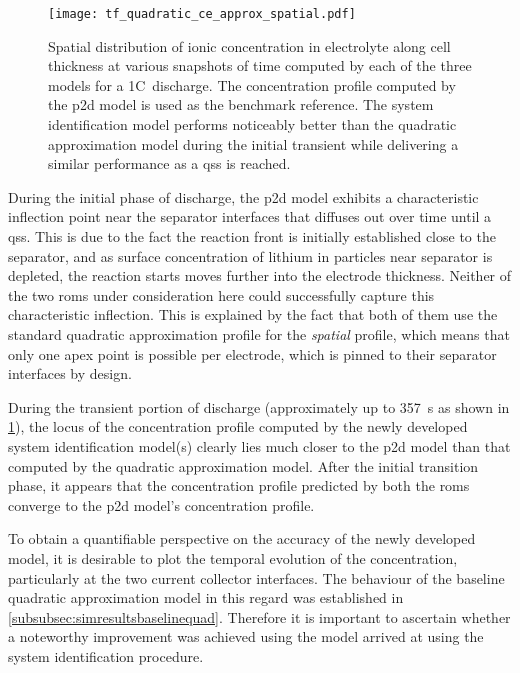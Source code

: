 \begin{figure}[!htbp]
    \centering
    \texttt{[image: tf\_quadratic\_ce\_approx\_spatial.pdf]}
    \caption[Spatial distribution of ionic concentration in
    electrolyte for a 1C~discharge computed by the , quadratic
    approximation \& system identification models]{%
        Spatial distribution of ionic concentration  in electrolyte along cell
        thickness at various  snapshots of  time computed  by each of  the three
        models for  a 1C~discharge.  The concentration  profile  computed by
        the  \gls{p2d} model is used as the benchmark reference. The  system
        identification model performs noticeably better than the quadratic
        approximation model during  the initial  transient  while delivering a
        similar performance as a \gls{qss} is reached.
}%
\label{fig:tfquadp2dspatialionicconc1C}
\end{figure}

During  the  initial  phase  of   discharge,  the  \gls{p2d}  model  exhibits  a
characteristic inflection point near the  separator interfaces that diffuses out
over time  until a  \gls{qss}. This  is due to  the fact  the reaction  front is
initially established  close to the  separator, and as surface  concentration of
lithium  in particles  near separator  is  depleted, the  reaction starts  moves
further  into the  electrode thickness.  Neither  of the  two \glspl{rom}  under
consideration here  could successfully  capture this  characteristic inflection.
This is  explained by  the fact  that both  of them  use the  standard quadratic
approximation profile for the \emph{spatial}  profile, which means that only one
apex  point is  possible  per  electrode, which  is  pinned  to their  separator
interfaces by design.

During the transient portion of discharge (approximately up to \SI{357}{\second}
as   shown   in \cref{fig:tfquadp2dspatialionicconc1C}),   the  locus   of   the
concentration  profile computed  by  the newly  developed system  identification
model(s) clearly lies  much closer to the \gls{p2d} model  than that computed by
the  quadratic  approximation model.  After  the  initial transition  phase,  it
appears  that  the  concentration  profile predicted  by  both  the  \glspl{rom}
converge to the \gls{p2d} model's concentration profile.

To obtain  a quantifiable  perspective on  the accuracy  of the  newly developed
model, it  is desirable  to plot  the temporal  evolution of  the concentration,
particularly  at  the  two  current   collector  interfaces.  The  behaviour  of
the  baseline  quadratic approximation  model  in  this regard  was  established
in \cref{subsubsec:simresultsbaselinequad}.   Therefore  it   is  important   to
ascertain whether a noteworthy improvement  was achieved using the model arrived
at using the system identification procedure.

